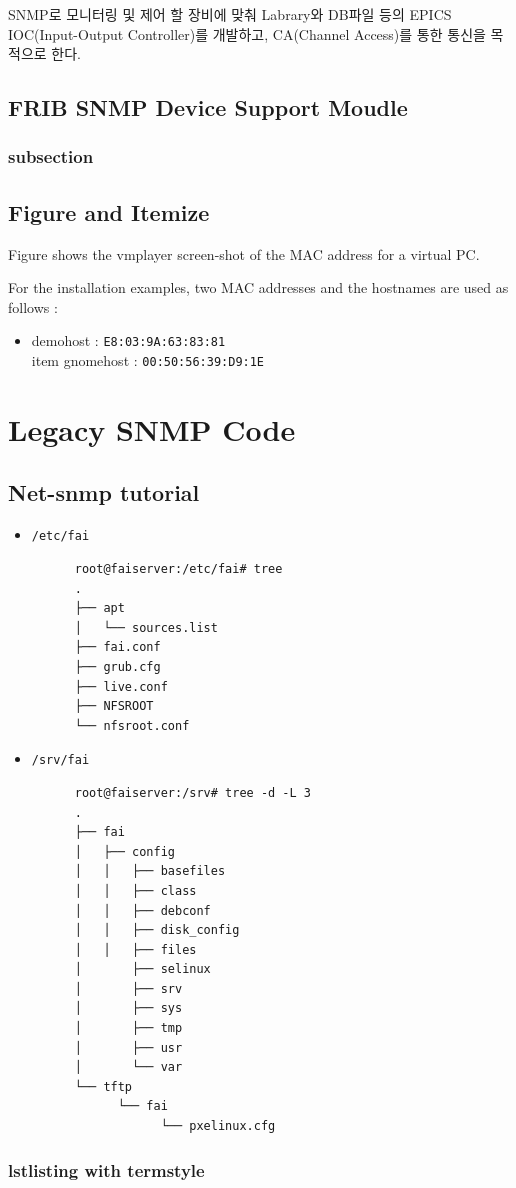 \documentclass[11pt
  , a4paper
  , article
  , oneside
]{memoir}
\begin{document}
SNMP로 모니터링 및 제어 할 장비에 맞춰 Labrary와 DB파일 등의 EPICS IOC(Input-Output Controller)를 개발하고, CA(Channel Access)를 통한 통신을 목적으로 한다. 





\section{FRIB SNMP Device Support Moudle}
\subsection{subsection}

\section{Figure and Itemize}
 Figure shows the vmplayer screen-shot of the MAC address for a virtual PC.

For the installation examples, two MAC addresses and the hostnames are used as follows :
\begin{itemize}
\item demohost  : \texttt{E8:03:9A:63:83:81}
\\item gnomehost : \texttt{00:50:56:39:D9:1E}
\end{itemize}



\clearpage

\chapter{Legacy SNMP Code}
\section{Net-snmp tutorial}

\begin{itemize}
  \item \texttt{/etc/fai}
    {\scriptsize
     \begin{verbatim}
      root@faiserver:/etc/fai# tree
      .
      ├── apt
      │   └── sources.list
      ├── fai.conf
      ├── grub.cfg
      ├── live.conf
      ├── NFSROOT
      └── nfsroot.conf
     \end{verbatim}
     }
  \item \texttt{/srv/fai}
    {\scriptsize
     \begin{verbatim}
      root@faiserver:/srv# tree -d -L 3
      .
      ├── fai
      │   ├── config
      │   │   ├── basefiles
      │   │   ├── class
      │   │   ├── debconf
      │   │   ├── disk_config
      │   │   ├── files
      │       ├── selinux
      │       ├── srv
      │       ├── sys
      │       ├── tmp
      │       ├── usr
      │       └── var
      └── tftp
            └── fai
                  └── pxelinux.cfg
  \end{verbatim}
  }
\end{itemize}

\subsection{lstlisting with termstyle}


\clearpage


\end{document}
